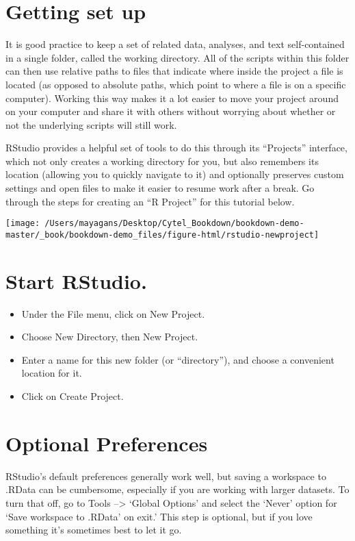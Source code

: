 \documentclass[]{book}
\providecommand{\tightlist}{%
  \setlength{\itemsep}{0pt}\setlength{\parskip}{0pt}}
\begin{document}
\section{Getting set up}\label{getting-set-up}

It is good practice to keep a set of related data, analyses, and text
self-contained in a single folder, called the working directory. All of
the scripts within this folder can then use relative paths to files that
indicate where inside the project a file is located (as opposed to
absolute paths, which point to where a file is on a specific computer).
Working this way makes it a lot easier to move your project around on
your computer and share it with others without worrying about whether or
not the underlying scripts will still work.

RStudio provides a helpful set of tools to do this through its
``Projects'' interface, which not only creates a working directory for
you, but also remembers its location (allowing you to quickly navigate
to it) and optionally preserves custom settings and open files to make
it easier to resume work after a break. Go through the steps for
creating an ``R Project'' for this tutorial below.

\texttt{[image: /Users/mayagans/Desktop/Cytel\_Bookdown/bookdown-demo-master/\_book/bookdown-demo\_files/figure-html/rstudio-newproject]}

\section{Start RStudio.}\label{start-rstudio.}

\begin{itemize}
\tightlist
\item
  Under the File menu, click on New Project.
\item
  Choose New Directory, then New Project.
\item
  Enter a name for this new folder (or ``directory''), and choose a
  convenient location for it.
\item
  Click on Create Project.
\end{itemize}

\section{Optional Preferences}\label{optional-preferences}

RStudio's default preferences generally work well, but saving a
workspace to .RData can be cumbersome, especially if you are working
with larger datasets. To turn that off, go to Tools --\textgreater{}
`Global Options' and select the `Never' option for `Save workspace to
.RData' on exit.' This step is optional, but if you love something it's
sometimes best to let it go.
\end{document}
